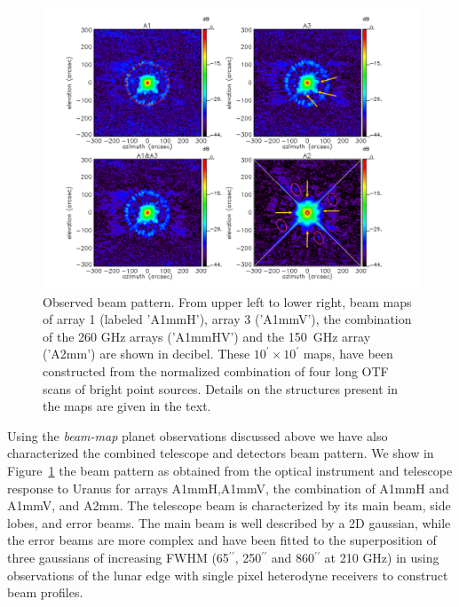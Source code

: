 \documentclass[]{aa} %
\begin{document}
\begin{figure}[h]
   \centering
    \includegraphics[width=0.9\linewidth]{Beams_features.pdf}
     
      \caption{Observed beam pattern. From upper left to lower right,
        beam maps of array 1 (labeled 'A1mmH'), array 3 ('A1mmV'), the
        combination of the 260 GHz arrays ('A1mmHV') and the 150~GHz array
        ('A2mm') are shown in decibel. These $10^{\prime} \times 10^{\prime}$ maps, have been constructed from
        the normalized combination of four long OTF scans of bright point
        sources. Details on the structures present in the maps are given in the text.}
         \label{fig:beampattern}
\end{figure}

Using the {\it beam-map} planet observations discussed above we have also characterized the combined telescope and detectors beam pattern. We show in Figure~\ref{fig:beampattern} the beam pattern as obtained from the optical instrument and telescope response to Uranus for arrays A1mmH,A1mmV, the combination of A1mmH and A1mmV, and A2mm. The telescope beam is characterized by its main beam, side lobes, and error beams. The main beam is well described by a 2D gaussian, while the error beams are more complex and have been fitted to the superposition of three gaussians of increasing FWHM (65$^{\prime \prime}$, 250$^{\prime \prime}$ and 860$^{\prime \prime}$ at 210 GHz) in \cite{greve1998,kramer2013} using observations of the lunar edge with single pixel heterodyne receivers to construct beam profiles.
\end{document}

